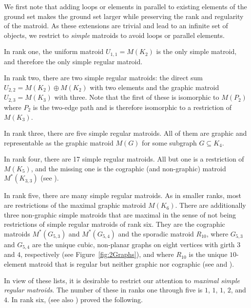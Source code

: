 \documentclass[reqno,12pt]{amsart}
\numberwithin{theorem}{section}
\theoremstyle{plain}
\theoremstyle{definition}
\theoremstyle{remark}
\numberwithin{equation}{section}
\numberwithin{table}{section}
\begin{document}
We first note that adding loops or elements in parallel to existing elements of the ground set makes the ground set larger while preserving the rank and regularity of the matroid. As these extensions are trivial and lead to an infinite set of objects, we restrict to {\it simple} matroids to avoid loops or parallel elements.

In rank one, the uniform matroid $U_{1,1} = M(K_2)$ is the only simple matroid, and therefore the only simple regular matroid.

In rank two, there are two simple regular matroids: the direct sum $U_{2,2}=M(K_2) \oplus M(K_2)$ with two elements and the graphic matroid $U_{2,3}=M(K_3)$ with three. Note that the first of these is isomorphic to $M(P_2)$ where $P_2$ is the two-edge path and is therefore isomorphic to a restriction of $M(K_3)$.

In rank three, there are five simple regular matroids. All of them are graphic and representable as the graphic matroid $M(G)$ for some subgraph $G \subseteq K_4$. 

In rank four, there are 17 simple regular matroids. All but one is a restriction of $M(K_5)$, and the missing one is the cographic (and non-graphic) matroid $M^*(K_{3,3})$ (see \cite{ErdahlRyshkov94,Nienhaus-pre}).

In rank five, there are many simple regular matroids. As in smaller ranks, most are restrictions of the maximal graphic matroid $M(K_6)$. There are additionally three non-graphic simple matroids that are maximal in the sense of not being restrictions of simple regular matroids of rank six. They are the cographic matroids $M^*(G_{5,3})$ and $M^*(G_{5,4})$ and the sporadic matroid $R_{10}$, where $G_{5,3}$ and $G_{5,4}$ are the unique cubic, non-planar graphs on eight vertices with girth $3$ and $4$, respectively (see Figure~\ref{fig:2Graphs}), and where $R_{10}$ is the unique $10$-element matroid that is regular but neither graphic nor cographic (see \cite{ErdahlRyshkov94} and \cite[Example 1.7]{KWW2}). 

In view of these lists, it is desirable to restrict our attention to {\it maximal simple regular matroids}. The number of these in ranks one through five is $1$, $1$, $1$, $2$, and $4$. In rank six, \cite{DanilovGrishukhin99} (see also \cite{Israel-PhD}) proved the following.
\end{document}
